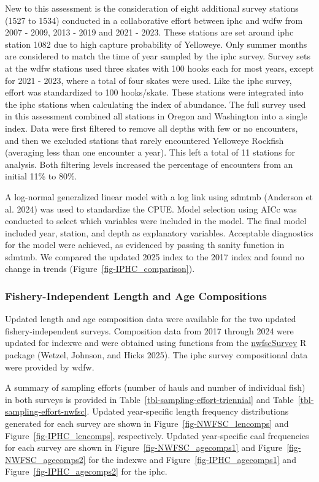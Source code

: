 \documentclass[
]{scrartcl}
\begin{document}
New to this assessment is the consideration of eight additional survey
stations (1527 to 1534) conducted in a collaborative effort between
\gls{iphc} and \gls{wdfw} from 2007 - 2009, 2013 - 2019 and 2021 - 2023.
These stations are set around \gls{iphc} station 1082 due to high
capture probability of Yelloweye. Only summer months are considered to
match the time of year sampled by the \gls{iphc} survey. Survey sets at
the \gls{wdfw} stations used three skates with 100 hooks each for most
years, except for 2021 - 2023, where a total of four skates were used.
Like the \gls{iphc} survey, effort was standardized to 100 hooks/skate.
These stations were integrated into the \gls{iphc} stations when
calculating the index of abundance. The full survey used in this
assessment combined all stations in Oregon and Washington into a single
index. Data were first filtered to remove all depths with few or no
encounters, and then we excluded stations that rarely encountered
Yelloweye Rockfish (averaging less than one encounter a year). This left
a total of 11 stations for analysis. Both filtering levels increased the
percentage of encounters from an initial 11\% to 80\%.

A log-normal generalized linear model with a log link using \gls{sdmtmb}
(Anderson et al. 2024) was used to standardize the CPUE. Model selection
using AICc was conducted to select which variables were included in the
model. The final model included year, station, and depth as explanatory
variables. Acceptable diagnostics for the model were achieved, as
evidenced by passing th sanity function in \gls{sdmtmb}. We compared the
updated 2025 index to the 2017 index and found no change in trends
(Figure~\ref{fig-IPHC_comparison}).

\subsubsection{Fishery-Independent Length and Age
Compositions}\label{fishery-independent-length-and-age-compositions}

Updated length and age composition data were available for the two
updated fishery-independent surveys. Composition data from 2017 through
2024 were updated for \gls{indexwc} and were obtained using functions
from the
\href{https://github.com/pfmc-assessments/nwfscSurvey}{nwfscSurvey} R
package (Wetzel, Johnson, and Hicks 2025). The \gls{iphc} survey
compositional data were provided by \gls{wdfw}.

A summary of sampling efforts (number of hauls and number of individual
fish) in both surveys is provided in
Table~\ref{tbl-sampling-effort-triennial} and
Table~\ref{tbl-sampling-effort-nwfsc}. Updated year-specific length
frequency distributions generated for each survey are shown in
Figure~\ref{fig-NWFSC_lencomps} and Figure~\ref{fig-IPHC_lencomps},
respectively. Updated year-specific \gls{caal} frequencies for each
survey are shown in Figure~\ref{fig-NWFSC_agecomps1} and
Figure~\ref{fig-NWFSC_agecomps2} for the \gls{indexwc} and
Figure~\ref{fig-IPHC_agecomps1} and Figure~\ref{fig-IPHC_agecomps2} for
the \gls{iphc}.
\end{document}
